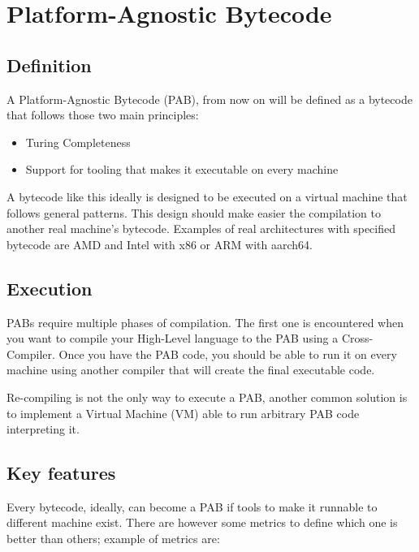 \documentclass[../main.tex]{subfiles}
\begin{document}
\section{Platform-Agnostic Bytecode}
\subsection{Definition}

A Platform-Agnostic Bytecode (PAB), from now on will be defined as a bytecode that follows those two main principles:
\begin{itemize}
    \item Turing Completeness
    \item Support for tooling that makes it executable on every machine
\end{itemize}

A bytecode like this ideally is designed to be executed on a virtual machine that follows general patterns. This design should make easier the compilation to another real machine's bytecode. Examples of real architectures with specified bytecode are AMD and Intel with x86 or ARM with aarch64. %

\subsection{Execution}

PABs require multiple phases of compilation. The first one is encountered when you want to compile your High-Level language to the PAB using a Cross-Compiler. Once you have the PAB code, you should be able to run it on every machine using another compiler that will create the final executable code.

Re-compiling is not the only way to execute a PAB, another common solution is to implement a Virtual Machine (VM) able to run arbitrary PAB code interpreting it.

\subsection{Key features}

Every bytecode, ideally, can become a PAB if tools to make it runnable to different machine exist. There are however some metrics to define which one is better than others; example of metrics are:
\end{document}
